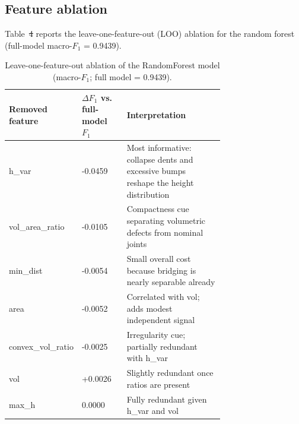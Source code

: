 \documentclass[3p]{elsarticle}
\makeatletter
\providecommand{\DIFaddtex}[1]{{\protect\color{blue}\uwave{#1}}} %
\providecommand{\DIFdeltex}[1]{{\protect\color{red}\sout{#1}}} %
\providecommand{\DIFaddbegin}{} %
\providecommand{\DIFaddend}{} %
\providecommand{\DIFdelbegin}{} %
\providecommand{\DIFdelend}{} %
\providecommand{\DIFaddbeginFL}{} %
\providecommand{\DIFaddendFL}{} %
\providecommand{\DIFadd}[1]{\texorpdfstring{\DIFaddtex{#1}}{#1}} %
\providecommand{\DIFdel}[1]{\texorpdfstring{\DIFdeltex{#1}}{}} %
\providecommand{\DIFscaledelfig}{0.5}
\newlength{\DIFdelgraphicswidth} %
\newlength{\DIFdelgraphicsheight} %
\providecommand{\DIFaddincludegraphics}[2][]{{\color{blue}\fbox{\DIFOincludegraphics[#1]{#2}}}} %
\providecommand{\DIFdelincludegraphics}[2][]{%
\sbox{\DIFdelgraphicsbox}{\DIFOincludegraphics[#1]{#2}}%
\settoboxwidth{\DIFdelgraphicswidth}{\DIFdelgraphicsbox} %
\settoboxtotalheight{\DIFdelgraphicsheight}{\DIFdelgraphicsbox} %
\scalebox{\DIFscaledelfig}{%
\parbox[b]{\DIFdelgraphicswidth}{\usebox{\DIFdelgraphicsbox}\\[-\baselineskip] \rule{\DIFdelgraphicswidth}{0em}}\llap{\resizebox{\DIFdelgraphicswidth}{\DIFdelgraphicsheight}{%
\setlength{\unitlength}{\DIFdelgraphicswidth}%
\begin{picture}(1,1)%
\thicklines\linethickness{2pt} %
{\color[rgb]{1,0,0}\put(0,0){\framebox(1,1){}}}%
{\color[rgb]{1,0,0}\put(0,0){\line( 1,1){1}}}%
{\color[rgb]{1,0,0}\put(0,1){\line(1,-1){1}}}%
\end{picture}%
}\hspace*{3pt}}} %
} %
\DeclareRobustCommand{\DIFaddbegin}{\DIFOaddbegin \let\includegraphics\DIFaddincludegraphics} %
\DeclareRobustCommand{\DIFaddend}{\DIFOaddend \let\includegraphics\DIFOincludegraphics} %
\DeclareRobustCommand{\DIFdelbegin}{\DIFOdelbegin \let\includegraphics\DIFdelincludegraphics} %
\DeclareRobustCommand{\DIFdelend}{\DIFOaddend \let\includegraphics\DIFOincludegraphics} %
\DeclareRobustCommand{\DIFaddbeginFL}{\DIFOaddbeginFL \let\includegraphics\DIFaddincludegraphics} %
\DeclareRobustCommand{\DIFaddendFL}{\DIFOaddendFL \let\includegraphics\DIFOincludegraphics} %
\let\sout@orig\sout %
\renewcommand{\sout}[1]{\ifmmode\text{\sout@orig{\ensuremath{#1}}}\else\sout@orig{#1}\fi} %
\makeatother
\begin{document}
\DIFaddend \subsection{Feature ablation}
Table~\DIFdelbegin \DIFdel{4 }\DIFdelend \DIFaddbegin \DIFadd{\ref{tab:loo} }\DIFaddend reports the leave-one-feature-out (LOO) ablation for the random forest (full-model macro-$F_1$ = 0.9439).
\begin{table}[htbp]
\centering
\caption{Leave-one-feature-out ablation of the RandomForest model (macro-$F_1$; full model = 0.9439).}
\DIFaddbeginFL \label{tab:loo}
\DIFaddendFL \begin{tabular}{lp{0.22\linewidth}p{0.50\linewidth}}
\toprule
\textbf{Removed feature} & \textbf{$\Delta F_1$ vs. full-model $F_1$} & \textbf{Interpretation} \\
\midrule
h\_var & -0.0459 & Most informative: collapse dents and excessive bumps reshape the height distribution \\
vol\_area\_ratio & -0.0105 & Compactness cue separating volumetric defects from nominal joints \\
min\_dist & -0.0054 & Small overall cost because bridging is nearly separable already \\
area & -0.0052 & Correlated with vol; adds modest independent signal \\
convex\_vol\_ratio & -0.0025 & Irregularity cue; partially redundant with h\_var \\
vol & +0.0026 & Slightly redundant once ratios are present \\
max\_h & 0.0000 & Fully redundant given h\_var and vol \\
\bottomrule
\end{tabular}
\end{table}
\end{document}
